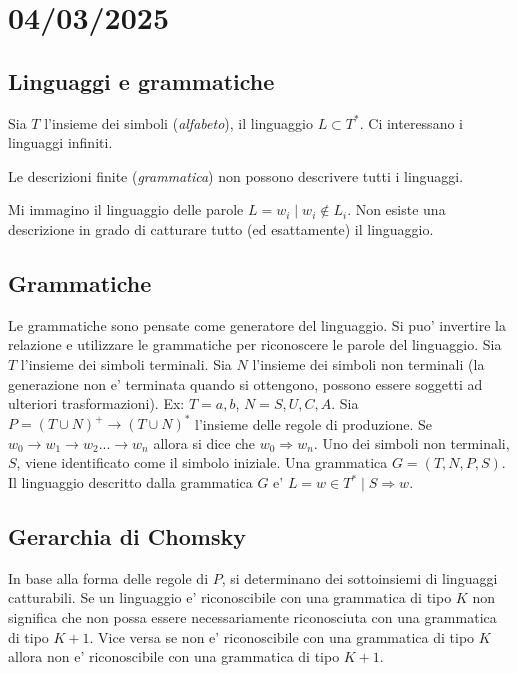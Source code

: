 \chapter{04/03/2025}

\section{Linguaggi e grammatiche}

Sia $T$ l'insieme dei simboli (\textit{alfabeto}), il linguaggio $L \subset T^{*}$.
Ci interessano i linguaggi infiniti.

Le descrizioni finite (\textit{grammatica}) non possono descrivere tutti i linguaggi.

Mi immagino il linguaggio delle parole $L = {w_i \; | \; w_i \notin L_i}$. Non esiste una descrizione in grado di catturare tutto (ed esattamente) il linguaggio.


\section{Grammatiche}

Le grammatiche sono pensate come generatore del linguaggio. Si puo' invertire la relazione e utilizzare le grammatiche per riconoscere le parole del linguaggio.
Sia $T$ l'insieme dei simboli terminali. Sia $N$ l'insieme dei simboli non terminali (la generazione non e' terminata quando si ottengono, possono essere soggetti ad ulteriori trasformazioni).
Ex: $T = {a,b}$, $N = {S,U,C,A}$.
Sia $P = {(T \cup N)^{+} \rightarrow (T \cup N)^{*}}$ l'insieme delle regole di produzione.
Se $w_0 \rightarrow w_1 \rightarrow w_2 ... \rightarrow w_n$ allora si dice che $w_0 \Rightarrow w_n$.
Uno dei simboli non terminali, $S$, viene identificato come il simbolo iniziale.
Una grammatica $G = (T, N, P, S)$. Il linguaggio descritto dalla grammatica $G$ e' $L = {w \in T^{*} \; | \; S \Rightarrow w}$.

\section{Gerarchia di Chomsky}

In base alla forma delle regole di $P$, si determinano dei sottoinsiemi di linguaggi catturabili.
Se un linguaggio e' riconoscibile con una grammatica di tipo $K$ non significa che non possa essere necessariamente riconosciuta con una grammatica di tipo $K+1$.
Vice versa se non e' riconoscibile con una grammatica di tipo $K$ allora non e' riconoscibile con una grammatica di tipo $K+1$.

